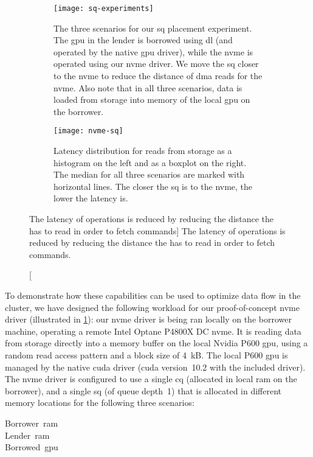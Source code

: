 \begin{figure}
    \centering
    \begin{subfigure}{\linewidth}
        \centering
        \texttt{[image: sq-experiments]}
        \caption{The three scenarios for our \gls{sq} placement experiment. The \gls{gpu} in the lender is borrowed using \gls{dl} (and operated by the native \gls{gpu} driver), while the \gls{nvme} is operated using our \gls{nvme} driver. We move the \gls{sq} closer to the \gls{nvme} to reduce the distance of \gls{dma} reads for the \gls{nvme}. Also note that in all three scenarios, data is loaded from storage into memory of the local \gls{gpu} on the borrower.}
        \label{fig:eval-nvme-topo}
    \end{subfigure}
    \par\vspace{5mm}
    \begin{subfigure}{\linewidth}
        \centering
        \texttt{[image: nvme-sq]}
        \caption{Latency distribution for reads from storage as a histogram on the left and as a boxplot on the right. The median for all three scenarios are marked with horizontal lines. The closer the \gls{sq} is to the \gls{nvme}, the lower the latency is.}
        \label{fig:eval-nvme-results}
    \end{subfigure}
    \caption
    [The latency of  operations is reduced by reducing the distance the  has to read in order to fetch  commands]
    {The latency of  operations is reduced by reducing the distance the  has to read in order to fetch  commands.}
    \label{fig:eval-nvme}
\end{figure}



To demonstrate how these capabilities can be used to optimize data flow in the cluster, we have designed the following workload for our proof-of-concept \gls{nvme} driver (illustrated in \cref{fig:eval-nvme-topo}):
%
our \gls{nvme} driver is being ran locally on the borrower machine, operating a remote Intel Optane P4800X DC \gls{nvme}.
%
It is reading data from storage directly into a memory buffer on the local Nvidia P600 \gls{gpu}, using a random read access pattern and a block size of 4~kB. 
%
The local P600 \gls{gpu} is managed by the native \gls{cuda} driver (\gls{cuda} version~10.2 with the included driver).
%
The \gls{nvme} driver is configured to use a single \gls{cq} (allocated in local \gls{ram} on the borrower), and a single \gls{sq} (of queue depth~1) that is allocated in different memory locations for the following three scenarios:
\begin{description}
    \item[Borrower~\gls{ram}]
    \item[Lender~\gls{ram}]
    \item[Borrowed~\gls{gpu}]
\end{description}



